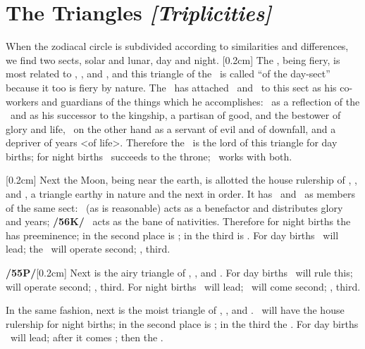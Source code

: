 \section{The Triangles \textit{[Triplicities]}}

When the zodiacal circle is subdivided according to similarities and differences, we find two sects, solar and lunar, day and night. 
[0.2cm]
The \Sun, being fiery, is most related to \Aries, \Leo, and \Sagittarius, and this triangle of the \Sun\, is called “of the day-sect” because it too is fiery by nature. The \Sun\, has attached \Jupiter\, and \Saturn\, to this sect as his co-workers and guardians of the things which he accomplishes: \Jupiter\, as a reflection of the \Sun\, and as his successor to the kingship, a partisan of good, and the bestower of glory
and life, \Saturn\, on the other hand as a servant of evil and of downfall, and a depriver of years <of life>. Therefore the \Sun\, is the lord of this triangle for day births; for night births \Jupiter\, succeeds to the throne; \Saturn\, works with both.

[0.2cm]
Next the Moon, being near the earth, is allotted the house rulership of \Taurus, \Virgo, and \Capricorn, a triangle earthy in nature and the next in order. It has \Venus\, and \Mars\, as members of the same sect: \Venus\,
(as is reasonable) acts as a benefactor and distributes glory and years; \textbf{/56K/} \Mars\, acts as the bane of
nativities. Therefore for night births the \Moon\, has preeminence; in the second place is \Venus; in the third
is \Mars. For day births \Venus\, will lead; the \Moon\, will operate second; \Mars, third.

\textbf{/55P/}[0.2cm] Next is the airy triangle of \Gemini, \Libra, and \Aquarius. For day births \Saturn\, will rule this;
\Mercury\, will operate second; \Jupiter, third. For night births \Mercury\, will lead; \Saturn\, will come second; \Jupiter, third.

In the same fashion, next is the moist triangle of \Cancer, \Scorpio, and \Pisces. \Mars\, will have the house rulership for night births; in the second place is \Venus; in the third the \Moon. For day births \Venus\, will lead; after it comes \Mars; then the \Moon. 

